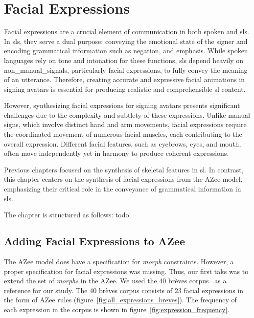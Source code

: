 \documentclass[../../main]{subfiles}
\begin{document}
\chapter{Facial Expressions}
\label{ch:facial_expressions}

Facial expressions are a crucial element of communication in both spoken and \gls{sl}s. In \gls{sl}s, they serve a dual purpose: conveying the emotional state of the signer and encoding grammatical information such as negation, and emphasis. While spoken languages rely on tone and intonation for these functions, \gls{sl}s depend heavily on \gls{non_manual_signals}, particularly facial expressions, to fully convey the meaning of an utterance. Therefore, creating accurate and expressive facial animations in signing avatars is essential for producing realistic and comprehensible \gls{sl} content.

However, synthesizing facial expressions for signing avatars presents significant challenges due to the complexity and subtlety of these expressions. Unlike manual signs, which involve distinct hand and arm movements, facial expressions require the coordinated movement of numerous facial muscles, each contributing to the overall expression. Different facial features, such as eyebrows, eyes, and mouth, often move independently yet in harmony to produce coherent expressions.

Previous chapters focused on the synthesis of skeletal features in \gls{sl}. In contrast, this chapter centers on the synthesis of facial expressions from the AZee model, emphasizing their critical role in the conveyance of grammatical information in \gls{sl}s.

The chapter is structured as follows: todo

\section{Adding Facial Expressions to AZee}
\label{ch:facial_expressions:adding_facial_expressions_to_azee}

The AZee model does have a specification for \emph{morph} constraints. However, a proper specification for facial expressions was missing. Thus, our first taks was to extend the set of \emph{morphs} in the AZee. We used the 40 brèves corpus~\cite{challant2024extending, challant2022first} as a reference for our study. The 40 brèves corpus consists of 23 facial expressions in the form of AZee rules (figure~\ref{fig:all_expressions_breves}). The frequency of each expression in the corpus is shown in figure~\ref{fig:expression_frequency}.
\end{document}
